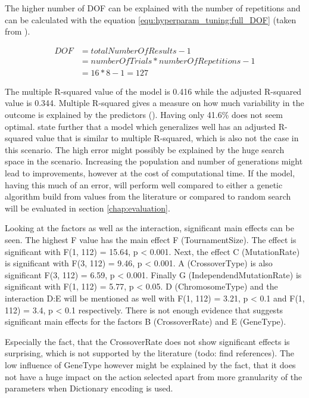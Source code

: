 The higher number of DOF can be explained with the number of repetitions and can be calculated with the equation \ref{equ:hyperparam_tuning:full_DOF} (taken from \cite{roy_primer_1990}).

\begin{equation} \label{equ:hyperparam_tuning:full_DOF}
	\begin{split}
		DOF & = totalNumberOfResults - 1 \\
		& = numberOfTrials * numberOfRepetitions - 1 \\
		& = 16 * 8 - 1 = 127
	\end{split}
\end{equation}

The multiple R-squared value of the model is 0.416 while the adjusted R-squared value is 0.344. Multiple R-squared gives a measure on how much variability in the outcome is explained by the predictors (\cite{field_discovering_2012}). Having only 41.6\% does not seem optimal. \cite{field_discovering_2012} state further that a model which generalizes well has an adjusted R-squared value that is similar to multiple R-squared, which is also not the case in this scenario.
The high error might possibly be explained by the huge search space in the scenario. Increasing the population and number of generations might lead to improvements, however at the cost of computational time. If the model, having this much of an error, will perform well compared to either a genetic algorithm build from values from the literature or compared to random search will be evaluated in section \ref{chap:evaluation}.

Looking at the factors as well as the interaction, significant main effects can be seen. The highest F value has the main effect F (TournamentSize). The effect is significant with F(1, 112) = 15.64, p < 0.001. Next, the effect C (MutationRate) is significant with F(3, 112) = 9.46, p < 0.001. A (CrossoverType) is also significant F(3, 112) = 6.59, p < 0.001. Finally G (IndependendMutationRate) is significant with F(1, 112) = 5.77, p < 0.05.
D (ChromosomeType) and the interaction D:E will be mentioned as well with F(1, 112) = 3.21, p < 0.1 and F(1, 112) = 3.4, p < 0.1 respectively.
There is not enough evidence that suggests significant main effects for the factors B (CrossoverRate) and E (GeneType).

Especially the fact, that the CrossoverRate does not show significant effects is surprising, which is not supported by the literature (todo: find references). The low influence of GeneType however might be explained by the fact, that it does not have a huge impact on the action selected apart from more granularity of the parameters when Dictionary encoding is used.

